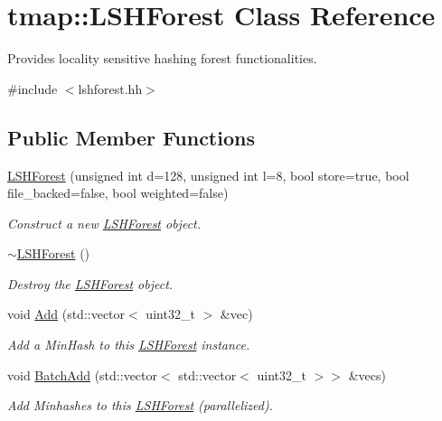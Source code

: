\hypertarget{classtmap_1_1LSHForest}{}\section{tmap\+:\+:L\+S\+H\+Forest Class Reference}
\label{classtmap_1_1LSHForest}


Provides locality sensitive hashing forest functionalities.  




{\ttfamily \#include $<$lshforest.\+hh$>$}

\subsection*{Public Member Functions}
\begin{DoxyCompactItemize}
\item 
\hyperlink{classtmap_1_1LSHForest_a90a9f6e40e63f90838c7ece0e0e3ec25}{L\+S\+H\+Forest} (unsigned int d=128, unsigned int l=8, bool store=true, bool file\+\_\+backed=false, bool weighted=false)
\begin{DoxyCompactList}\small\item\em Construct a new \hyperlink{classtmap_1_1LSHForest}{L\+S\+H\+Forest} object. \end{DoxyCompactList}\item 
\mbox{\label{classtmap_1_1LSHForest_a3ab5789f702f9dac3f801c7b9d53afd4}} 
\hyperlink{classtmap_1_1LSHForest_a3ab5789f702f9dac3f801c7b9d53afd4}{$\sim$\+L\+S\+H\+Forest} ()
\begin{DoxyCompactList}\small\item\em Destroy the \hyperlink{classtmap_1_1LSHForest}{L\+S\+H\+Forest} object. \end{DoxyCompactList}\item 
void \hyperlink{classtmap_1_1LSHForest_a480d0de16bc1e4b1365bf97b9b60223a}{Add} (std\+::vector$<$ uint32\+\_\+t $>$ \&vec)
\begin{DoxyCompactList}\small\item\em Add a Min\+Hash to this \hyperlink{classtmap_1_1LSHForest}{L\+S\+H\+Forest} instance. \end{DoxyCompactList}\item 
void \hyperlink{classtmap_1_1LSHForest_ab3f73f59918a37b63662679461828cbb}{Batch\+Add} (std\+::vector$<$ std\+::vector$<$ uint32\+\_\+t $>$$>$ \&vecs)
\begin{DoxyCompactList}\small\item\em Add Minhashes to this \hyperlink{classtmap_1_1LSHForest}{L\+S\+H\+Forest} (parallelized). \end{DoxyCompactList}\item 
$$
\end{DoxyCompactItemize}
